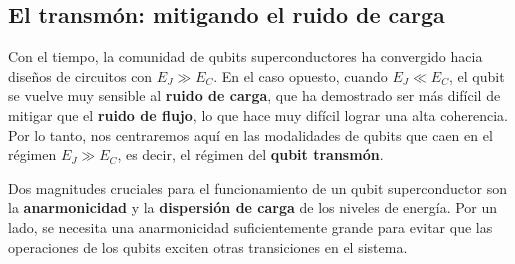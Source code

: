     

    


    \subsection{El transmón: mitigando el ruido de carga}   \label{sec_scq_transmon_normal}

    
    Con el tiempo, la comunidad de qubits superconductores ha convergido hacia diseños de circuitos con $E_J \gg E_C$. En el caso opuesto, cuando $E_J \ll E_C$, el qubit se vuelve muy sensible al \textbf{ruido de carga}, que ha demostrado ser más difícil de mitigar que el \textbf{ruido de flujo}, lo que hace muy difícil lograr una alta coherencia. Por lo tanto, nos centraremos aquí en las modalidades de qubits que caen en el régimen $E_J \gg E_C$, es decir, el régimen del \textbf{qubit transmón}. 
    
    Dos magnitudes cruciales para el funcionamiento de un qubit superconductor son la \textbf{anarmonicidad} y la \textbf{dispersión de carga} de los niveles de energía. Por un lado, se necesita una anarmonicidad suficientemente grande para evitar que las operaciones de los qubits exciten otras transiciones en el sistema. 
    
